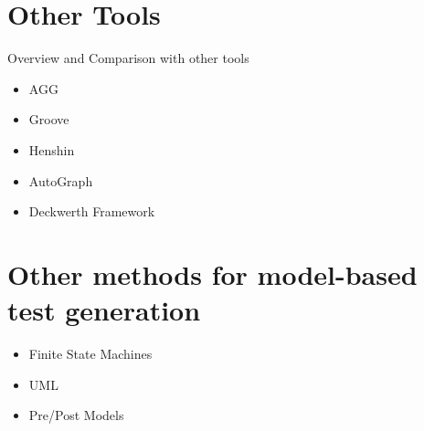 \section{Other Tools}

Overview and Comparison with other tools

\begin{itemize}
\item AGG
\item Groove
\item Henshin
\item AutoGraph
\item Deckwerth Framework
\end{itemize}

\section{Other methods for model-based test generation}

\begin{itemize}
  \item Finite State Machines
  \item UML
  \item Pre/Post Models
\end{itemize}

